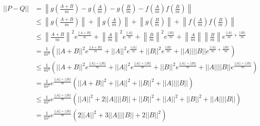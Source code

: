 \documentclass[a4paper, 10pt, dvipdfmx]{jlreq}
\begin{document}
\begin{align*}
  ||P-Q|| & = \left\lVert g\left(\frac{A+B}{m}\right)-g\left(\frac{A}{m}\right)-g\left(\frac{B}{m}\right)-f\left(\frac{A}{m}\right)f\left(\frac{B}{m}\right) \right\rVert                                                                                                                                      \\
          & \leq \left\lVert g\left(\frac{A+B}{m}\right)\right\rVert+\left\lVert g\left(\frac{A}{m}\right)\right\rVert+\left\lVert g\left(\frac{B}{m}\right)\right\rVert+\left\lVert f\left(\frac{A}{m}\right)f\left(\frac{B}{m}\right) \right\rVert                                                           \\
          & \leq \left\lVert \frac{A+B}{m}\right\rVert^2 e^{\frac{||A+B||}{m}}+\left\lVert \frac{A}{m}\right\rVert^2 e^{\frac{||A||}{m}}+\left\lVert \frac{B}{m}\right\rVert^2 e^{\frac{||B||}{m}}+\left\lVert \frac{A}{m}\right\rVert\left\lVert \frac{B}{m} \right\rVert e^{\frac{||A||}{m}+\frac{||B||}{m}} \\
          & = \frac{1}{m^2} \left(||A+B||^2 e^{\frac{||A+B||}{m}}+ ||A||^2 e^{\frac{||A||}{m}}+ ||B||^2 e^{\frac{||B||}{m}}+ ||A|| ||B|| e^{\frac{||A||}{m}+\frac{||B||}{m}}\right)                                                                                                                            \\
          & \leq \frac{1}{m^2} \left(||A+B||^2 e^{\frac{||A||+||B||}{m}}+ ||A||^2 e^{\frac{||A||+||B||}{m}}+ ||B||^2 e^{\frac{||A||+||B||}{m}}+ ||A|| ||B|| e^{\frac{||A||+||B||}{m}}\right)                                                                                                                   \\
          & = \frac{1}{m^2}e^{\frac{||A||+||B||}{m}} \left(||A+B||^2 + ||A||^2 + ||B||^2 + ||A|| ||B|| \right)                                                                                                                                                                                                 \\
          & \leq \frac{1}{m^2}e^{\frac{||A||+||B||}{m}} \left(||A||^2+2||A||||B||+||B||^2 + ||A||^2 + ||B||^2 + ||A||||B|| \right)                                                                                                                                                                             \\
          & = \frac{1}{m^2}e^{\frac{||A||+||B||}{m}} \left(2||A||^2+3||A||||B||+2||B||^2 \right)                                                                                                                                                                                                               \\

\end{align*}
\end{document}
